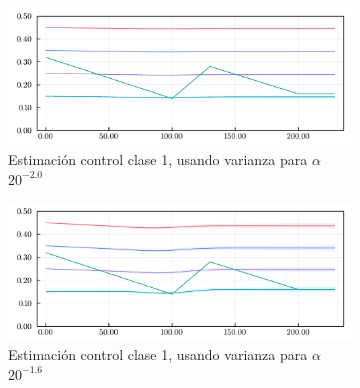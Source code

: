 \begin{figure}[!h]
\centering
\begin{subfigure}[b]{0.47\textwidth}
     \centering
     \includegraphics[width=\textwidth]{img/resultados/synth/sensialphacov_alphacov0-003_0alphaini0-15_0-1_0-45_high1_b2real1-88_gereal0-1961_gireal0-1389_acov0-8_aini0-27675_gcov0-05gamma_e_0-1961_gamma_i_0-1389_beta_2_1-8800.pdf}
     \caption{Estimación control clase 1, usando varianza para \(\alpha\) \(20^{-2.0}\)}
     \label{fig:legend-sensi-acov-class1--2-0}
\end{subfigure} 
\hfill
\begin{subfigure}[b]{0.47\textwidth}
     \centering
     \includegraphics[width=\textwidth]{img/resultados/synth/sensialphacov_alphacov0-008_0alphaini0-15_0-1_0-45_high1_b2real1-88_gereal0-1961_gireal0-1389_acov0-8_aini0-27675_gcov0-05gamma_e_0-1961_gamma_i_0-1389_beta_2_1-8800.pdf}
     \caption{Estimación control clase 1, usando varianza para \(\alpha\) \(20^{-1.6}\)}
     \label{fig:legend-sensi-acov-class1--1-6}
\end{subfigure} 
\hfill
\begin{subfigure}[b]{0.47\textwidth}

\end{subfigure}
\end{figure}
